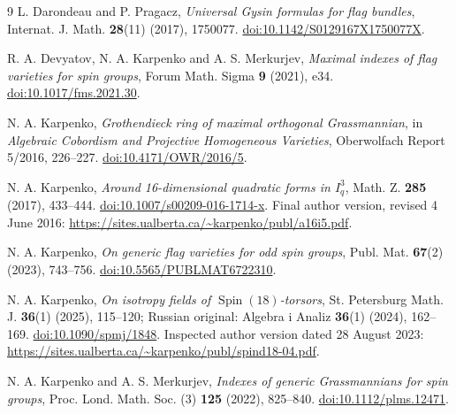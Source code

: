 \documentclass[11pt]{article}
\begin{document}
\begin{thebibliography}{9}
L. Darondeau and P. Pragacz,
\emph{Universal Gysin formulas for flag bundles},
Internat. J. Math. \textbf{28}(11) (2017), 1750077.
\href{https://doi.org/10.1142/S0129167X1750077X}{doi:10.1142/S0129167X1750077X}.

R. A. Devyatov, N. A. Karpenko and A. S. Merkurjev,
\emph{Maximal indexes of flag varieties for spin groups},
Forum Math. Sigma \textbf{9} (2021), e34.
\href{https://doi.org/10.1017/fms.2021.30}{doi:10.1017/fms.2021.30}.

N. A. Karpenko, \emph{Grothendieck ring of maximal orthogonal Grassmannian},
in \emph{Algebraic Cobordism and Projective Homogeneous Varieties},
Oberwolfach Report 5/2016, 226--227.
\href{https://doi.org/10.4171/OWR/2016/5}{doi:10.4171/OWR/2016/5}.

N. A. Karpenko, \emph{Around 16-dimensional quadratic forms in $I_q^3$},
Math. Z. \textbf{285} (2017), 433--444.
\href{https://doi.org/10.1007/s00209-016-1714-x}{doi:10.1007/s00209-016-1714-x}.
Final author version, revised 4 June 2016:
\url{https://sites.ualberta.ca/~karpenko/publ/a16i5.pdf}.

N. A. Karpenko, \emph{On generic flag varieties for odd spin groups},
Publ. Mat. \textbf{67}(2) (2023), 743--756.
\href{https://doi.org/10.5565/PUBLMAT6722310}{doi:10.5565/PUBLMAT6722310}.

N. A. Karpenko, \emph{On isotropy fields of $\operatorname{Spin}(18)$-torsors},
St. Petersburg Math. J. \textbf{36}(1) (2025), 115--120;
Russian original: Algebra i Analiz \textbf{36}(1) (2024), 162--169.
\href{https://doi.org/10.1090/spmj/1848}{doi:10.1090/spmj/1848}.
Inspected author version dated 28 August 2023:
\url{https://sites.ualberta.ca/~karpenko/publ/spind18-04.pdf}.

N. A. Karpenko and A. S. Merkurjev,
\emph{Indexes of generic Grassmannians for spin groups},
Proc. Lond. Math. Soc. (3) \textbf{125} (2022), 825--840.
\href{https://doi.org/10.1112/plms.12471}{doi:10.1112/plms.12471}.
\end{thebibliography}
\end{document}
